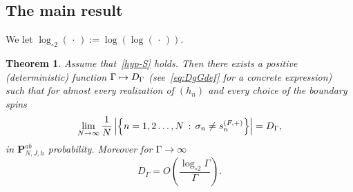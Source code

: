 \documentclass[10pt]{amsart}
\newtheorem{theo}{Theorem}[section]
\theoremstyle{definition}\newtheorem{defi}[theo]{Definition}\newtheorem{rema}[theo]{Remark}\newtheorem{exam}[theo]{Example}\newtheorem{exem}[theo]{Example}\newtheorem{nota}[theo]{Notation}
\newcommand{\bP}{\mathbf{P}}
\newcommand{\gG}{\Gamma}
\newcommand{\gs}{\sigma}
\newcommand{\loglog}{\log_{\circ 2}}
\renewcommand*{\to}{\mathchoice{\longrightarrow}{\rightarrow}{\rightarrow}{\rightarrow}}
\let\oldmapsto\mapsto
\renewcommand*{\mapsto}{\mathchoice{\longmapsto}{\oldmapsto}{\oldmapsto}{\oldmapsto}}
\begin{document}
\subsection{The main result}\label{sec:main}
We let $\loglog(\,\cdot\,):= \log(\log(\,\cdot\,))$.


\begin{theo}\label{th:main}
Assume that~\eqref{hyp-S} holds. Then there exists a positive (deterministic) function $\gG \mapsto D_\gG$ (see~\eqref{eq:DgGdef} for a concrete expression) such that for almost every realization of $(h_n)$ and every choice of the boundary spins
\begin{equation}\label{eq:main1}
\lim_{N \to \infty} \frac 1N \left| \left\{ n=1,2 \dots, N\,:\, \gs_n \neq s^{(F, +)}_n\right\} \right| = D_\gG,
\end{equation}
in $\bP^{ab}_{N, J, h}$ probability. Moreover for $\gG \to \infty$
\begin{equation}\label{eq:main2}
D_\gG = O \left(\frac{\loglog \gG }\gG\right).
\end{equation}
\end{theo}
\end{document}
